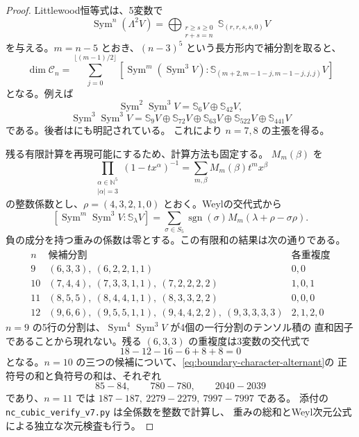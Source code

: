 \documentclass[a4paper,11pt]{ltjsarticle}
\theoremstyle{definition}
\newcommand{\Sym}{\operatorname{Sym}}
\begin{document}
\begin{proof}
Littlewood恒等式\cite[式(6)]{BeteaWheeler}は、5変数で
\[
 \Sym^n(\Lambda^2V)=
 \bigoplus_{\substack{r\ge s\ge0\\r+s=n}}
           \mathbb S_{(r,r,s,s,0)}V
\]
を与える。$m=n-5$ とおき、$(n-3)^5$ という長方形内で補分割を取ると、
\begin{equation}\label{eq:boundary-plethysm-candidates}
 \dim\mathcal C_n=
 \sum_{j=0}^{\lfloor(m-1)/2\rfloor}
 [\Sym^m(\Sym^3V):
   \mathbb S_{(m+2,m-1-j,m-1-j,j,j)}V]
\end{equation}
となる。例えば
\[
 \Sym^2\Sym^3V=\mathbb S_6V\oplus\mathbb S_{42}V,
\]
\[
 \Sym^3\Sym^3V=
 \mathbb S_9V\oplus\mathbb S_{72}V\oplus\mathbb S_{63}V
 \oplus\mathbb S_{522}V\oplus\mathbb S_{441}V
\]
である。後者は\cite[Example 1.6]{DeBoeckPagetWildon}にも明記されている。
これにより $n=7,8$ の主張を得る。

残る有限計算を再現可能にするため、計算方法も固定する。
$M_m(\beta)$ を
\[
 \prod_{\substack{\alpha\in\mathbb N^5\\|\alpha|=3}}
       (1-tx^\alpha)^{-1}
   =\sum_{m,\beta}M_m(\beta)t^mx^\beta
\]
の整数係数とし、$\rho=(4,3,2,1,0)$ とおく。Weylの交代式から
\begin{equation}\label{eq:boundary-character-alternant}
 [\Sym^m\Sym^3V:\mathbb S_\lambda V]
 =\sum_{\sigma\in S_5}\operatorname{sgn}(\sigma)
     M_m(\lambda+\rho-\sigma\rho).
\end{equation}
負の成分を持つ重みの係数は零とする。この有限和の結果は次の通りである。
\[
\begin{array}{c|l|l}
 n&\text{候補分割}&\text{各重複度}\\ \hline
 9 &(6,3,3),\ (6,2,2,1,1)&0,0\\
 10&(7,4,4),\ (7,3,3,1,1),\ (7,2,2,2,2)&1,0,1\\
 11&(8,5,5),\ (8,4,4,1,1),\ (8,3,3,2,2)&0,0,0\\
 12&(9,6,6),\ (9,5,5,1,1),\ (9,4,4,2,2),\ (9,3,3,3,3)&2,1,2,0
\end{array}
\]
$n=9$ の5行の分割は、$\Sym^4\Sym^3V$ が4個の一行分割のテンソル積の
直和因子であることから現れない。残る $(6,3,3)$ の重複度は3変数の交代式で
\[
                       18-12-16-6+8+8=0
\]
となる。$n=10$ の三つの候補について、\eqref{eq:boundary-character-alternant}の
正符号の和と負符号の和は、それぞれ
\[
                    85-84,\qquad780-780,\qquad2040-2039
\]
であり、$n=11$ では $187-187,\ 2279-2279,\ 7997-7997$ である。
添付の \texttt{nc\_cubic\_verify\_v7.py} は全係数を整数で計算し、
重みの総和とWeyl次元公式による独立な次元検査も行う。
\end{proof}
\end{document}
